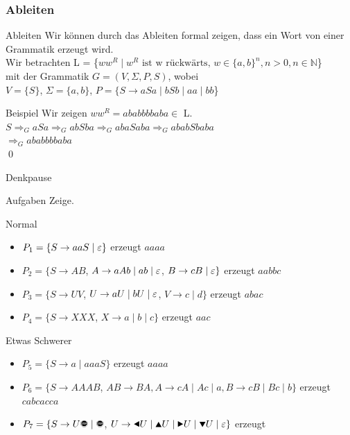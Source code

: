 \subsubsection{Ableiten}
\begin{frame}[fragile]{Ableiten}
    Wir können durch das Ableiten formal zeigen, dass ein Wort von einer Grammatik erzeugt wird.\\
    \small{Wir betrachten L = \{$ww^R\;|\;w^R\text{ ist w rückwärts, }w \in \{a, b\}^n, n>0, n\in \mathbb{N}$\}\\
    mit der Grammatik $G=(V,\Sigma,P,S)$, wobei\\
    $V=\{S\}$, $\Sigma=\{a,b\}$, $P = \{S \rightarrow aSa \mid bSb \mid aa \mid bb$\}}
    \begin{exampleblock}{Beispiel}
        Wir zeigen $ww^R = ababbbbaba \in$ L.\\
        \small{$S\Rightarrow_G aSa \Rightarrow_G abSba \Rightarrow_G  abaSaba \Rightarrow_G ababSbaba$ \\ $\Rightarrow_G ababbbbaba$}\\\qed
    \end{exampleblock}
\end{frame}

{
\begin{frame}{Denkpause}
    \begin{alertblock}{Aufgaben}
    Zeige.
    \end{alertblock}
    \begin{block}{Normal}
    \begin{itemize}
        \item $P_1=\{S\rightarrow aaS\;|\;\varepsilon\}$ erzeugt $aaaa$
        \item $P_2=\{S\rightarrow AB$, $A\rightarrow aAb \;|\; ab\; |\;\varepsilon$, $B\rightarrow cB \;|\; \varepsilon\}$ erzeugt $aabbc$
        \item $P_3=\{S\rightarrow UV$, $U\rightarrow aU \;|\; bU \; |\; \varepsilon$, $V\rightarrow c \;|\; d\}$ erzeugt $abac$
        \item $P_4=\{S\rightarrow XXX$, $X\rightarrow a \;|\; b \;|\; c\}$ erzeugt $aac$
    \end{itemize}
    \end{block}
    \begin{block}{Etwas Schwerer}
    \begin{itemize}
        \item $P_5=\{S\rightarrow a \;|\; aaaS\}$ erzeugt $aaaa$
        \item $P_6=\{S\rightarrow AAAB$, $AB\rightarrow BA, 
        A\rightarrow cA \;|\; Ac \;|\; a, 
        B\rightarrow cB \;|\; Bc \;|\; b\}$ erzeugt $cabcacca$
        \item $P_7=\{S\rightarrow U\text{\Stopsign} \;|\; \text{\Stopsign}$, $U\rightarrow \text{\Rewind} U \;|\; \text{\MoveUp} U \;|\; \text{\Forward} U \;|\; \text{\MoveDown} U \;|\;\emptyWord\}$ erzeugt \Forward\Stopsign
    \end{itemize}
    \end{block}
\end{frame}
}

